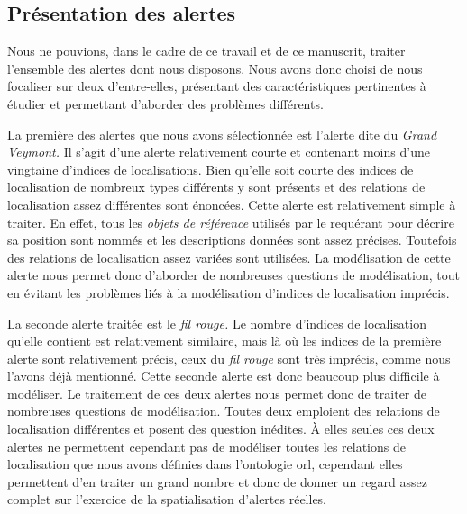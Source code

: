 \subsection{Présentation des alertes}

Nous ne pouvions, dans le cadre de ce travail et de ce manuscrit,
traiter l'ensemble des alertes dont nous disposons. Nous avons donc
choisi de nous focaliser sur deux d'entre-elles, présentant des
caractéristiques pertinentes à étudier et permettant d'aborder des
problèmes différents.

La première des alertes que nous avons sélectionnée est l’alerte dite
du \emph{Grand Veymont.} Il s'agit d'une alerte relativement courte et
contenant moins d'une vingtaine d'indices de localisations. Bien
qu'elle soit courte des indices de localisation de nombreux types
différents y sont présents et des relations de localisation assez
différentes sont énoncées. Cette alerte est relativement simple à
traiter. En effet, tous les \emph{objets de référence} utilisés par le
requérant pour décrire sa position sont nommés et les descriptions
données sont assez précises. Toutefois des relations de localisation
assez variées sont utilisées. La modélisation de cette alerte nous
permet donc d'aborder de nombreuses questions de modélisation, tout en
évitant les problèmes liés à la modélisation d'indices de localisation
imprécis.

La seconde alerte traitée est le \emph{fil rouge.} Le nombre d'indices
de localisation qu'elle contient est relativement similaire, mais là
où les indices de la première alerte sont relativement précis, ceux du
\emph{fil rouge} sont très imprécis, comme nous l'avons déjà
mentionné. Cette seconde alerte est donc beaucoup plus difficile à
modéliser. Le traitement de ces deux alertes nous permet donc de
traiter de nombreuses questions de modélisation. Toutes deux emploient
des relations de localisation différentes et posent des question
inédites. À elles seules ces deux alertes ne permettent cependant pas
de modéliser toutes les relations de localisation que nous avons
définies dans l'ontologie \ac{orl}, cependant elles permettent d'en
traiter un grand nombre et donc de donner un regard assez complet sur
l'exercice de la spatialisation d'alertes réelles.

